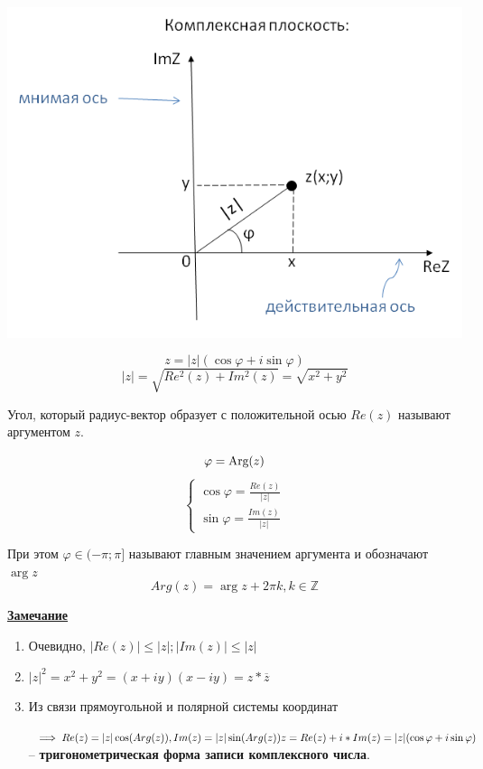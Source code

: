 \documentclass[a4paper,oneside]{article}
\newcommand{\parspace}{\vspace{10pt}}
\theoremstyle{definition}
\theoremstyle{definition}
\theoremstyle{definition}
\begin{document}
\includegraphics[scale=0.4]{complexplane1}

\[z = |z|(\cos  \varphi + i \sin  \varphi)\]
\[|z| = \sqrt{Re^2(z) + Im^2(z)} = \sqrt{x^2 + y^2}\]

Угол, который радиус-вектор образует с положительной осью $Re(z)$
называют аргументом $z$.

\[ \varphi = \textnormal{Arg}(z)\]
\[
    \begin{cases}
        \cos  \varphi = \frac{Re(z)}{|z|} \\
        \sin  \varphi = \frac{Im(z)}{|z|}
    \end{cases}
\]

При этом $ \varphi \in (-\pi; \pi]$ называют главным значением аргумента и обозначают $\arg z$
\[Arg(z) = \arg z + 2 \pi k, k \in \mathbb{Z}\]

\parspace

\underline{\textbf{Замечание}}

\begin{enumerate}
    \item Очевидно, $|Re(z)| \le |z|; |Im(z)| \le |z|$
    \item $|z|^2 = x^2 + y^2 = (x + iy)(x - iy) = z * \overline{z}$
    \item Из связи прямоугольной и полярной системы координат 
    
    $\implies Re(z) = |z| \cos (Arg(z)), Im(z) = |z| \sin (Arg(z)) \\
    z = Re(z) + i*Im(z) = |z|(\cos  \varphi + i \sin  \varphi)$ -- \textbf{тригонометрическая
    форма записи комплексного числа}.
\end{enumerate}
\end{document}
